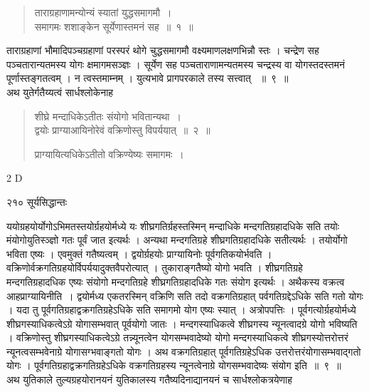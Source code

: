 \documentclass[11pt, openany]{book}
\begin{document}
\begin{quote}
{\ssi ताराग्रहाणामन्योन्यं स्यातां युद्धसमागमौ~।\\
 समागमः शशाङ्केन सूर्येणास्तमनं सह~॥~१~॥ }
 \end{quote}


 ताराग्रहाणां भौमादिपञ्चग्रहाणां परस्परं थोगे चुद्धसमागमौ वक्ष्यमाणलक्षणभिन्नौ स्तः । चन्द्रेण सह पञ्चतारान्यतमस्य योगः क्षमागमसञ्ज्ञः । सूर्येण सह पञ्चताराणामन्यतमस्य चन्द्रस्य वा योगस्तदस्तमनं पूर्णास्तङ्गतत्वम् । न त्वस्तमाम्नम् । युत्यभावे प्रागपरकाले तस्य सत्त्वात्~ ॥~९~॥\\
\noindent अथ युतेर्गतैय्यत्वं सार्धश्लोकेनाह \textendash


 \begin{quote}
 {\ssi शीघ्रे मन्दाधिकेऽतीतः संयोगो भवितान्यथा~।\\
 द्वयोः प्राग्याआयिनोरेवं वक्रिणोस्तु विपर्ययात्~॥~२~॥

प्राग्यायित्यधिकेऽतीतो वक्रिण्येष्यः समागमः~।}
\end{quote}
{\tiny{2 D}}

\newpage

\noindent २१० \hspace{4cm} सूर्यसिद्धान्तः 
\vspace{1cm}


 ययोग्रहयोर्योगोऽभिमतस्तयोर्ग्रहयोर्मध्ये यः शीघ्रगतिर्ग्रहस्तस्मिन् मन्दाधिके मन्दगतिग्रहादधिके सति तयोः मंयोगोयुतिस्ञ्ज्ञो गतः पूर्वं जात इत्यर्थः । अन्यथा मन्दगतिग्रहे शीघ्रगतिग्रहादधिके सतीत्यर्थः । तयोर्योगो भविता एष्यः । एवमुक्तं गतैष्यत्वम् । द्वयोर्ग्रहयोः प्राग्यायिनोः पूर्वगतिकयोर्भवति । वक्रिणोर्वक्रगतिग्रहयोर्विपर्ययादुक्तवैपरोत्यात् । तुकाराङ्गतैष्यो योगो भवति । शीघ्रगतिग्रहे मन्दगतिग्रहादधिक एष्यः संयोगो मन्दगतिग्रहे शीघ्रगतिग्रहादधिके गतः संयोग इत्यर्थः । अथैकस्य वक्रत्व आह\textendash प्राग्यायिनीति~। द्वयोर्मध्य एकतरस्मिन् वक्रिणि सति तदो वक्रगतिग्रहात् पर्वगतिग्रद्देऽधिके सति गतो योगः । यदा तु पूर्वगतिग्रहाद्वक्रगतिग्रहेऽधिके सति समागमो योग एष्यः स्यात् । अत्रोपपत्तिः । पूर्वगत्योर्ग्रहयोर्मध्ये शीघ्रगस्याधिकत्वेऽग्रे योगासम्भवात् पूर्वयोगो जातः । मन्दगस्याधिकत्वे शीघ्रगस्य न्यूनत्वादग्रे योगो भविष्यति । वक्रिणोस्तु शीघ्रगस्याधिकत्वेऽग्रे तन्न्यूनत्वेन योगसम्भवादेष्यो योगो मन्दगस्याधिकत्वे शीघ्रगस्योत्तरोत्तरं न्यूनत्वसम्भवेनाग्रे योगासग्भवाङ्गतो योगः । अथ वक्रगतिग्रहात् पूर्वगतिग्रहेऽधिक उत्तरोत्तरंयोगासम्भवाद्गतो योगः । पूर्वगतिग्रहाद्वक्रगतिग्रहेऽधिके वक्रगतिग्रहस्य न्यूनत्वेनाग्रे योगसम्भवादेष्यः संयोग इति~॥~९~॥\\
\noindent अथ युतिकाले तुल्यग्रहयोरानयनं युतिकालस्य गतैष्यदिनाद्यानयनं च सार्धश्लोकत्रयेणाह\textendash
\end{document}
